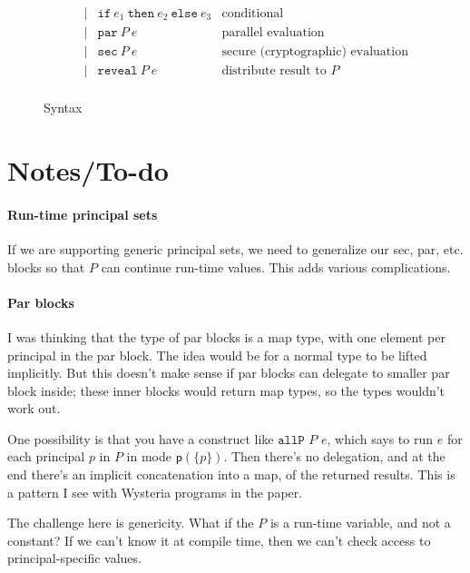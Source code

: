 \documentclass[10pt]{article}
\newcommand{\kw}[1]{\ensuremath{\mathtt{#1}}}
\newcommand{\epar}[2]{\ensuremath{\kw{par}~{#1}~{#2}}}
\newcommand{\esec}[2]{\ensuremath{\kw{sec}~{#1}~{#2}}}
\newcommand{\ereveal}[2]{\ensuremath{\kw{reveal}~{#1}~{#2}}}
\newcommand{\econd}[3]{\ensuremath{\kw{if}~{#1}~\kw{then}~{#2}~\kw{else}~{#3}}}
\newcommand{\mpar}[1]{\ensuremath{\mathsf{p}(#1)}}
\begin{document}
\begin{figure}[h]
\[\begin{array}{rlcll}
                       && \mid & \econd{e_1}{e_2}{e_3}  & \text{conditional} \\
                       && \mid & \epar{P}{e} & \text{parallel evaluation}\\
                       && \mid & \esec{P}{e} & \text{secure (cryptographic) evaluation}\\
                       && \mid & \ereveal{P}{e} & \text{distribute result to $P$}\\
  \end{array}
  \]
  \caption{Syntax}
  \label{fig:syntax}
\end{figure}

\section{Notes/To-do}

\paragraph{Run-time principal sets}

If we are supporting generic principal sets, we need to generalize our
sec, par, etc. blocks so that $P$ can continue run-time values. This
adds various complications.

\paragraph{Par blocks}

I was thinking that the type of par blocks is a map type, with one
element per principal in the par block. The idea would be for a normal
type to be lifted implicitly. But this doesn't make sense if par
blocks can delegate to smaller par block inside; these inner blocks
would return map types, so the types wouldn't work out.

One possibility is that you have a construct like $\mathtt{allP}$ $P$
$e$, which says to run $e$ for each principal $p$ in $P$ in mode
$\mpar{\{p\}}$. Then there's no delegation, and at the end there's an
implicit concatenation into a map, of the returned results. This is a
pattern I see with Wysteria programs in the paper.

The challenge here is genericity. What if the $P$ is a run-time
variable, and not a constant? If we can't know it at compile time,
then we can't check access to principal-specific values.
\end{document}
